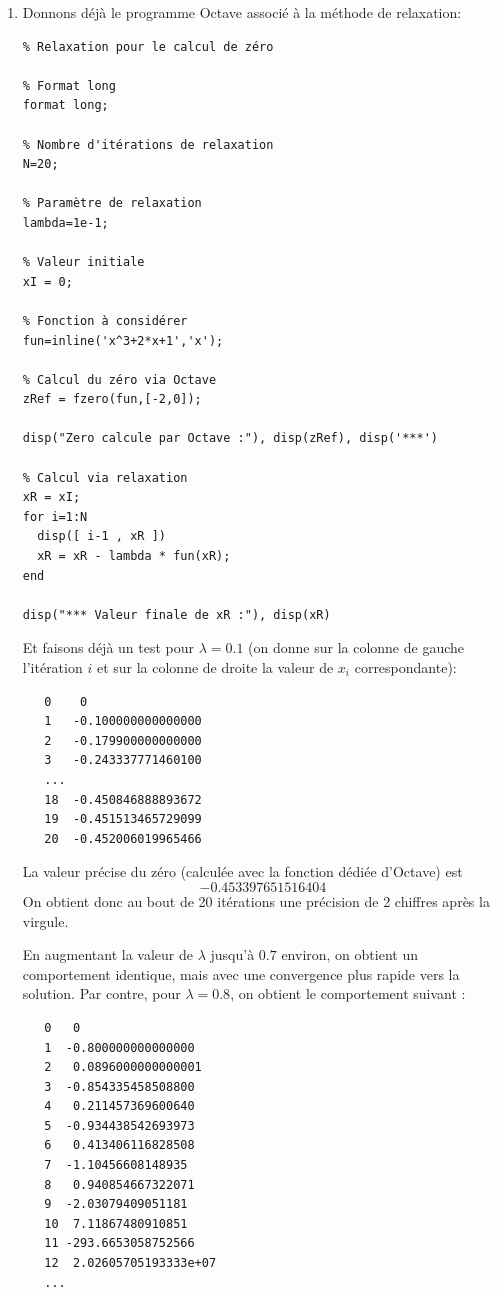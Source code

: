 \documentclass{article}
\begin{document}
\begin{enumerate}
    \item Donnons déjà le programme Octave associé à la méthode de relaxation:

{\footnotesize
\begin{verbatim}
% Relaxation pour le calcul de zéro

% Format long
format long;

% Nombre d'itérations de relaxation
N=20;

% Paramètre de relaxation
lambda=1e-1;

% Valeur initiale
xI = 0;

% Fonction à considérer
fun=inline('x^3+2*x+1','x');

% Calcul du zéro via Octave
zRef = fzero(fun,[-2,0]);

disp("Zero calcule par Octave :"), disp(zRef), disp('***')

% Calcul via relaxation
xR = xI;
for i=1:N 
  disp([ i-1 , xR ])
  xR = xR - lambda * fun(xR);
end
  
disp("*** Valeur finale de xR :"), disp(xR)
\end{verbatim}
}

Et faisons déjà un test pour $\lambda = 0.1$ (on donne sur la colonne de gauche l'itération $i$ et sur la colonne de droite la valeur de $x_i$ correspondante):

{\footnotesize
\begin{verbatim}
   0    0
   1   -0.100000000000000
   2   -0.179900000000000
   3   -0.243337771460100
   ...
   18  -0.450846888893672
   19  -0.451513465729099
   20  -0.452006019965466
\end{verbatim}
}

La valeur précise du zéro (calculée avec la fonction dédiée d'Octave) est %
$$-0.453397651516404$$ On obtient donc au bout de 20 itérations une précision de 2 chiffres après la virgule.

En augmentant la valeur de $\lambda$ jusqu'à $0.7$ environ, on obtient un comportement identique, mais avec une convergence plus rapide vers la solution. Par contre, pour $\lambda=0.8$, on obtient le comportement suivant :

{\footnotesize
\begin{verbatim}
   0   0
   1  -0.800000000000000
   2   0.0896000000000001
   3  -0.854335458508800
   4   0.211457369600640
   5  -0.934438542693973
   6   0.413406116828508
   7  -1.10456608148935
   8   0.940854667322071
   9  -2.03079409051181
   10  7.11867480910851
   11 -293.6653058752566
   12  2.02605705193333e+07
   ...
\end{verbatim}
}


\end{enumerate}
\end{document}

